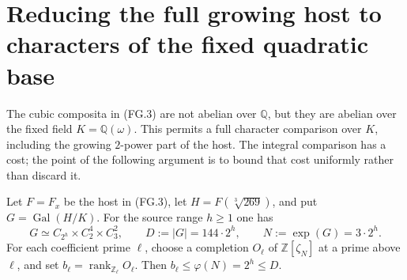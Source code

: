 \section{Reducing the full growing host to characters of the fixed quadratic base}
\label{sec:fixed-base-character-reduction}

The cubic composita in (FG.3) are not abelian over
$\mathbb Q$, but they are abelian over the fixed field
$K=\mathbb Q(\omega)$.  This permits a full character
comparison over $K$, including the growing $2$-power
part of the host.  The integral comparison has a cost;
the point of the following argument is to bound that
cost uniformly rather than discard it.

\begin{theorem}
\label{AC-K25}
Let $F=F_x$ be the host in (FG.3), let
$H=F(\sqrt[3]{269})$, and put $G=\operatorname{Gal}(H/K)$.
For the source range $h\geq1$ one has
\[
 G\simeq C_{2^h}\times C_2^4\times C_3^2,
 \qquad D:=|G|=144\cdot2^h,
 \qquad N:=\exp(G)=3\cdot2^h.                 \tag{FC.1}
\]
For each coefficient prime $\ell$, choose a completion
$O_\ell$ of $\mathbb Z[\zeta_N]$ at a prime above $\ell$,
and set $b_\ell=\operatorname{rank}_{\mathbb Z_\ell}O_\ell$.
Then $b_\ell\leq\varphi(N)=2^h\leq D$.


\end{theorem}
